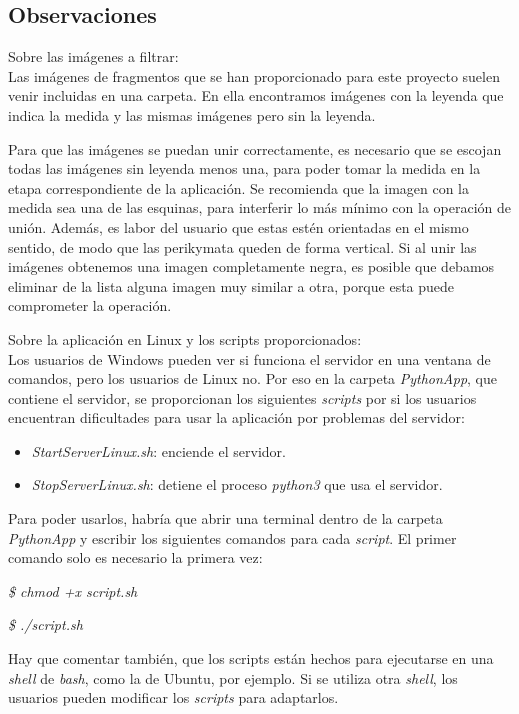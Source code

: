 \subsection{Observaciones}

Sobre las imágenes a filtrar:\\
Las imágenes de fragmentos que se han proporcionado para este proyecto suelen venir incluidas en una carpeta. En ella encontramos imágenes con la leyenda que indica la medida y las mismas imágenes pero sin la leyenda. 

Para que las imágenes se puedan unir correctamente, es necesario que se escojan todas las imágenes sin leyenda menos una, para poder tomar la medida en la etapa correspondiente de la aplicación. Se recomienda que la imagen con la medida sea una de las esquinas, para interferir lo más mínimo con la operación de unión. Además, es labor del usuario que estas estén orientadas en el mismo sentido, de modo que las perikymata queden de forma vertical. Si al unir las imágenes obtenemos una imagen completamente negra, es posible que debamos eliminar de la lista alguna imagen muy similar a otra, porque esta puede comprometer la operación.

Sobre la aplicación en Linux y los scripts proporcionados:\\
Los usuarios de Windows pueden ver si funciona el servidor en una ventana de comandos, pero los usuarios de Linux no. Por eso en la carpeta \textit{PythonApp}, que contiene el servidor, se proporcionan los siguientes \textit{scripts} por si los usuarios encuentran dificultades para usar la aplicación por problemas del servidor:
\begin{itemize}
     \item \textit{StartServerLinux.sh}: enciende el servidor.
     \item \textit{StopServerLinux.sh}: detiene el proceso \textit{python3} que usa el servidor.
\end{itemize}

Para poder usarlos, habría que abrir una terminal dentro de la carpeta \textit{PythonApp} y escribir los siguientes comandos para cada \textit{script}. El primer comando solo es necesario la primera vez:\\
\centerline{\textit{\$ chmod +x script.sh}}
\centerline{\textit{\$ ./script.sh}}

Hay que comentar también, que los scripts están hechos para ejecutarse en una \textit{shell} de \textit{bash}, como la de Ubuntu, por ejemplo. Si se utiliza otra \textit{shell}, los usuarios pueden modificar los \textit{scripts} para adaptarlos.